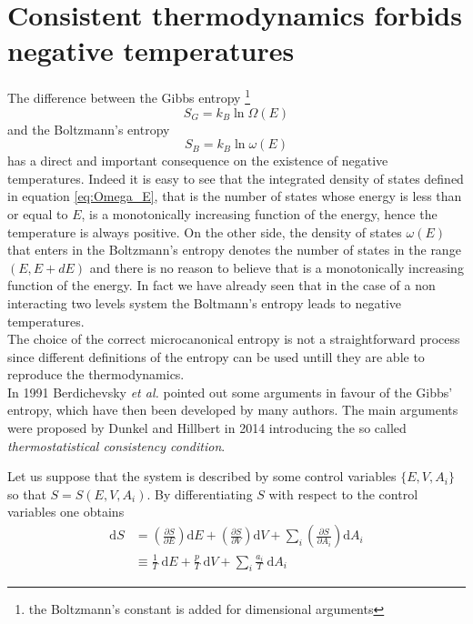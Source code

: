 \section{Consistent thermodynamics forbids negative temperatures}
The difference between the Gibbs entropy \footnote{the Boltzmann's constant is added for dimensional arguments}
\begin{equation}
    S_G = k_B \ln \Omega(E)
    \label{eq:gibbs_entropy_formula}
\end{equation}  
and the Boltzmann's entropy 
\begin{equation}
    S_B = k_B \ln \omega(E)
    \label{eq:Boltzmann_entropy_formula}
\end{equation}
has a direct and important consequence on the existence of negative temperatures. Indeed it is easy to see that the integrated density of states defined in equation 
\ref{eq:Omega_E}, that is the number of states whose energy is less than or equal to $E$, is a monotonically increasing function of the energy, hence the temperature is always positive. On the other side,
the density of states $\omega(E)$ that enters in the Boltzmann's entropy denotes the number of states in the range $(E, E+dE)$ and there is no reason to believe that is a monotonically increasing function of the energy. In fact we have already seen
that in the case of a non interacting two levels system the Boltmann's entropy leads to negative temperatures. \\
The choice of the correct microcanonical entropy is not a straightforward process since different definitions of the entropy can be used untill they are able to reproduce the thermodynamics. \\
In 1991 Berdichevsky \textit{et al.} \cite{original_entropy} pointed out some arguments in favour of the Gibbs' entropy, which have then been developed by many authors. The main arguments were proposed by 
Dunkel and Hillbert in 2014 \cite{Dunkel_Hillbert} introducing the so called \emph{thermostatistical consistency condition}. \par 
\vspace{10pt} 
Let us suppose that the system is described by some control variables $\{E, V, A_i\}$ so that $S = S(E, V, A_i)$. By differentiating $S$ with respect to the control variables one obtains
\begin{equation*}
    \begin{aligned}
        \mathrm{d} S &=\left(\frac{\partial S}{\partial E}\right) \mathrm{d} E+\left(\frac{\partial S}{\partial V}\right) \mathrm{d} V+\sum_{i}\left(\frac{\partial S}{\partial A_{i}}\right) \mathrm{d} A_{i} \\
        & \equiv \frac{1}{T} \mathrm{~d} E+\frac{p}{T} \mathrm{~d} V+\sum_{i} \frac{a_{i}}{T} \mathrm{~d} A_{i}
        \end{aligned}
\end{equation*}
